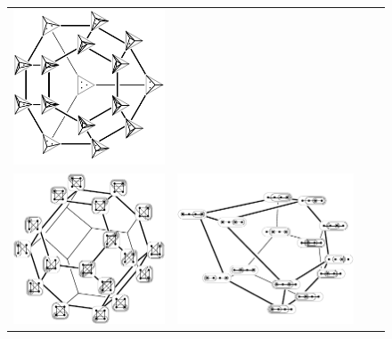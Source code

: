 \documentclass{amsart}
\theoremstyle{definition}
\begin{document}
\begin{figure}[t]
{\begin{tabular}{c@{\;}c@{\;}c@{\;}c}
			\includegraphics[scale=.6]{stellohedron} \\
			\includegraphics[scale=.6]{permutahedronTubings} &
			\includegraphics[scale=.6]{associahedronTubings} &

\end{tabular}}
\end{figure}
\end{document}
